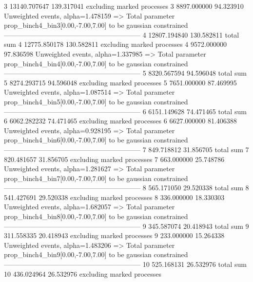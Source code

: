3          13140.707647    139.317041      excluding marked processes    
3          8897.000000     94.323910       Unweighted events, alpha=1.478159
  => Total parameter prop_binch4_bin3[0.00,-7.00,7.00] to be gaussian constrained
------------------------------------------------------------
4          12807.194840    130.582811      total sum                     
4          12775.850178    130.582811      excluding marked processes    
4          9572.000000     97.836598       Unweighted events, alpha=1.337985
  => Total parameter prop_binch4_bin4[0.00,-7.00,7.00] to be gaussian constrained
------------------------------------------------------------
5          8320.567594     94.596048       total sum                     
5          8274.293715     94.596048       excluding marked processes    
5          7651.000000     87.469995       Unweighted events, alpha=1.087514
  => Total parameter prop_binch4_bin5[0.00,-7.00,7.00] to be gaussian constrained
------------------------------------------------------------
6          6151.149628     74.471465       total sum                     
6          6062.282232     74.471465       excluding marked processes    
6          6627.000000     81.406388       Unweighted events, alpha=0.928195
  => Total parameter prop_binch4_bin6[0.00,-7.00,7.00] to be gaussian constrained
------------------------------------------------------------
7          849.718812      31.856705       total sum                     
7          820.481657      31.856705       excluding marked processes    
7          663.000000      25.748786       Unweighted events, alpha=1.281627
  => Total parameter prop_binch4_bin7[0.00,-7.00,7.00] to be gaussian constrained
------------------------------------------------------------
8          565.171050      29.520338       total sum                     
8          541.427691      29.520338       excluding marked processes    
8          336.000000      18.330303       Unweighted events, alpha=1.682057
  => Total parameter prop_binch4_bin8[0.00,-7.00,7.00] to be gaussian constrained
------------------------------------------------------------
9          345.587074      20.418943       total sum                     
9          311.558335      20.418943       excluding marked processes    
9          233.000000      15.264338       Unweighted events, alpha=1.483206
  => Total parameter prop_binch4_bin9[0.00,-7.00,7.00] to be gaussian constrained
------------------------------------------------------------
10         525.168131      26.532976       total sum                     
10         436.024964      26.532976       excluding marked processes    
